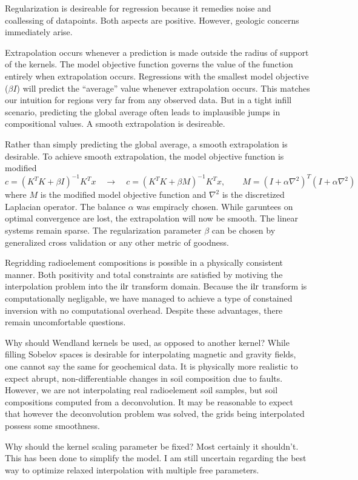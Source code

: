 \bigskip
{}
Regularization is desireable for regression because it remedies noise and coallessing of datapoints.
Both aspects are positive.
However, geologic concerns immediately arise.

\medskip
Extrapolation occurs whenever a prediction is made outside the radius of support of the kernels.
The model objective function governs the value of the function entirely when extrapolation occurs.
Regressions with the smallest model objective ($\beta I$) will predict the ``average'' value whenever extrapolation occurs.
This matches our intuition for regions very far from any observed data.
But in a tight infill scenario, predicting the global average often leads to implausible jumps in compositional values.
A smooth extrapolation is desireable.

\medskip
Rather than simply predicting the global average, a smooth extrapolation is desirable.
To achieve smooth extrapolation, the model objective function is modified
$$c = (K^T \! K + \beta I )^{-1} K^T x \quad \longrightarrow \quad c = (K^T \! K + \beta M )^{-1} K^T x, \qquad M = (I + \alpha \nabla^2)^T \! (I + \alpha \nabla^2) $$
where $M$ is the modified model objective function and $\nabla^2$ is the discretized Laplacian operator.
The balance $\alpha$ was empiracly chosen.
While garuntees on optimal convergence are lost, the extrapolation will now be smooth.
The linear systems remain sparse.
The regularization parameter $\beta$ can be chosen by generalized cross validation or any other metric of goodness.

\bigskip
{}
Regridding radioelement compositions is possible in a physically consistent manner.
Both positivity and total constraints are satisfied by motiving the interpolation problem into the $\rm ilr$ transform domain.
Because the $\rm ilr$ transform is computationally negligable, we have managed to achieve a type of constained inversion with no computational overhead.
Despite these advantages, there remain uncomfortable questions.

\medskip
{\reportifont Why should Wendland kernels be used, as opposed to another kernel?\/ }
While filling Sobelov spaces is desirable for interpolating magnetic and gravity fields, one cannot say the same for geochemical data.
It is physically more realistic to expect abrupt, non-differentiable changes in soil composition due to faults.
However, we are not interpolating real radioelement soil samples, but soil compositions computed from a deconvolution.
It may be reasonable to expect that however the deconvolution problem was solved, the grids being interpolated possess some smoothness.

\medskip
{\reportifont Why should the kernel scaling parameter be fixed?\/}
Most certainly it shouldn't.
This has been done to simplify the model.
I am still uncertain regarding the best way to optimize relaxed interpolation with multiple free parameters.

\bye
